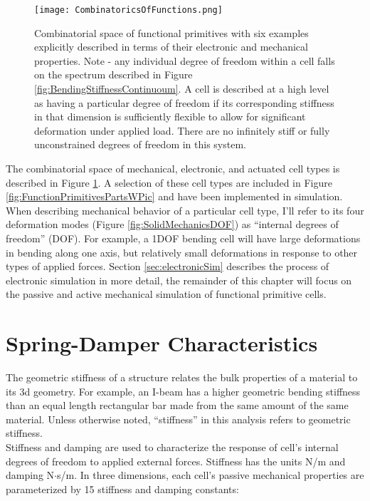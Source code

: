 {\begin{figure}
  \texttt{[image: CombinatoricsOfFunctions.png]}
  \caption{Combinatorial space of functional primitives with six examples explicitly described in terms of their electronic and mechanical properties.  Note - any individual degree of freedom within a cell falls on the spectrum described in Figure \ref{fig:BendingStiffnessContinuoum}.  A cell is described at a high level as having a particular degree of freedom if its corresponding stiffness in that dimension is sufficiently flexible to allow for significant deformation under applied load.  There are no infinitely stiff or fully unconstrained degrees of freedom in this system.}
  \label{fig:CombinatoricsOfFunctions}
\end{figure}

 The combinatorial space of mechanical, electronic, and actuated cell types is described in Figure \ref{fig:CombinatoricsOfFunctions}.  A selection of these cell types are included in Figure \ref{fig:FunctionPrimitivesPartsWPic} and have been implemented in simulation.  When describing mechanical behavior of a particular cell type, I'll refer to its four deformation modes (Figure \ref{fig:SolidMechanicsDOF}) as ``internal degrees of freedom'' (DOF).  For example, a 1DOF bending cell will have large deformations in bending along one axis, but relatively small deformations in response to other types of applied forces.  Section \ref{sec:electronicSim} describes the process of electronic simulation in more detail, the remainder of this chapter will focus on the passive and active mechanical simulation of functional primitive cells.

\section{Spring-Damper Characteristics}

The geometric stiffness of a structure relates the bulk properties of a material to its 3d geometry.  For example, an I-beam has a higher geometric bending stiffness than an equal length rectangular bar made from the same amount of the same material.  Unless otherwise noted, ``stiffness'' in this analysis refers to geometric stiffness.\\

Stiffness and damping are used to characterize the response of cell's internal degrees of freedom to applied external forces.  Stiffness has the units N/m and damping N$\cdot$s/m.  In three dimensions, each cell's passive mechanical properties are parameterized by 15 stiffness and damping constants:

}
